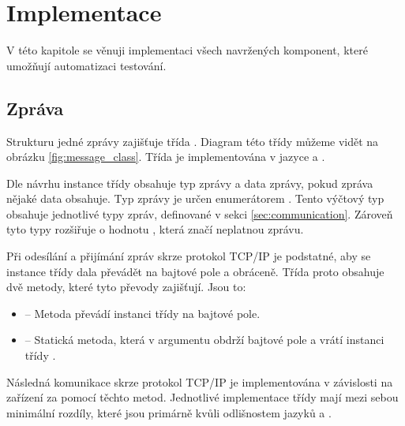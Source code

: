 \chapter{Implementace}\label{chap:implementation}

V této kapitole se věnuji implementaci všech navržených komponent, které umožňují automatizaci testování.

\section{Zpráva}
Strukturu jedné zprávy zajišťuje třída . Diagram této třídy můžeme vidět na obrázku \ref{fig:message_class}. Třída  je implementována v jazyce \csharp{} a \cpp{}.

Dle návrhu instance třídy obsahuje typ zprávy a data zprávy, pokud zpráva nějaké data obsahuje. Typ zprávy je určen enumerátorem {\nobreak{}}. Tento výčtový typ obsahuje jednotlivé typy zpráv, definované v sekci \ref{sec:communication}. Zároveň tyto typy rozšiřuje o hodnotu , která značí neplatnou zprávu.

Při odesílání a přijímání zpráv skrze protokol TCP/IP je podstatné, aby se instance třídy dala převádět na bajtové pole a obráceně. Třída  proto obsahuje dvě metody, které tyto převody zajišťují. Jsou to:

\begin{itemize}
    \item {} -- Metoda převádí instanci třídy  na bajtové pole.
    \item {} -- Statická metoda, která v argumentu obdrží bajtové pole a vrátí instanci třídy .
\end{itemize}

Následná komunikace skrze protokol TCP/IP je implementována v závislosti na zařízení za pomocí těchto metod. Jednotlivé implementace třídy  mají mezi sebou minimální rozdíly, které jsou primárně kvůli odlišnostem jazyků \csharp{} a \cpp{}.

